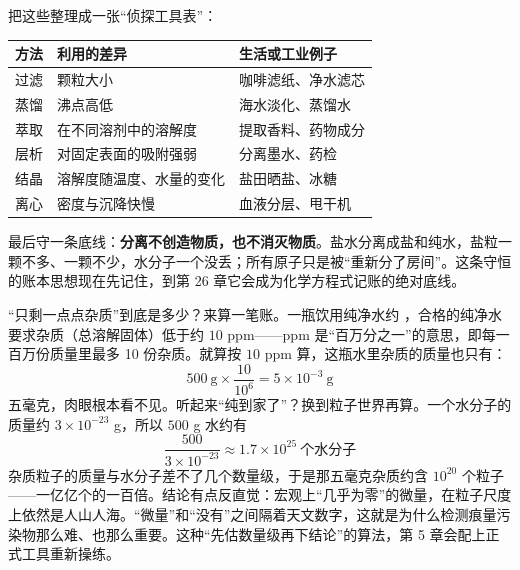 把这些整理成一张“侦探工具表”：

\begin{table}[htbp]
\centering
\begin{tabular}{lll}
\toprule
方法 & 利用的差异 & 生活或工业例子 \\
\midrule
过滤 & 颗粒大小 & 咖啡滤纸、净水滤芯 \\
蒸馏 & 沸点高低 & 海水淡化、蒸馏水 \\
萃取 & 在不同溶剂中的溶解度 & 提取香料、药物成分 \\
层析 & 对固定表面的吸附强弱 & 分离墨水、药检 \\
结晶 & 溶解度随温度、水量的变化 & 盐田晒盐、冰糖 \\
离心 & 密度与沉降快慢 & 血液分层、甩干机 \\
\bottomrule
\end{tabular}
\end{table}

最后守一条底线：\textbf{分离不创造物质，也不消灭物质}。盐水分离成盐和纯水，盐粒一颗不多、一颗不少，水分子一个没丢；所有原子只是被“重新分了房间”。这条守恒的账本思想现在先记住，到第 26 章它会成为化学方程式记账的绝对底线。

\begin{qiaoliang}
“只剩一点点杂质”到底是多少？来算一笔账。一瓶饮用纯净水约 ，合格的纯净水要求杂质（总溶解固体）低于约 $10$ ppm——ppm 是“百万分之一”的意思，即每一百万份质量里最多 10 份杂质。就算按 $10$ ppm 算，这瓶水里杂质的质量也只有：
\[500\ \mathrm{g} \times \frac{10}{10^{6}} = 5\times 10^{-3}\ \mathrm{g}\]
五毫克，肉眼根本看不见。听起来“纯到家了”？换到粒子世界再算。一个水分子的质量约 $3\times 10^{-23}$ g，所以 $500$ g 水约有
\[\frac{500}{3\times 10^{-23}} \approx 1.7\times 10^{25}\ \text{个水分子}\]
杂质粒子的质量与水分子差不了几个数量级，于是那五毫克杂质约含 $10^{20}$ 个粒子——一亿亿个的一百倍。结论有点反直觉：宏观上“几乎为零”的微量，在粒子尺度上依然是人山人海。“微量”和“没有”之间隔着天文数字，这就是为什么检测痕量污染物那么难、也那么重要。这种“先估数量级再下结论”的算法，第 5 章会配上正式工具重新操练。
\end{qiaoliang}

